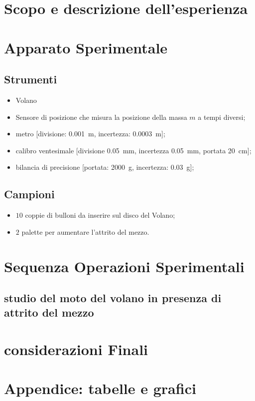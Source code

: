\documentclass[10pt,oneside,a4paper]{article}
\begin{document}
\section{Scopo e descrizione dell'esperienza}
\label{sec:descrizione}



\section{Apparato Sperimentale}
\subsection{Strumenti}
\label{subsec:strumenti}

\begin{itemize}
	\item Volano 
	\item Sensore di posizione che misura la posizione della massa $m$ a tempi diversi;
	\item metro [divisione: \SI{0.001}{m}, incertezza: \SI{0.0003}{m}];
	\item calibro ventesimale [divisione \SI{0,05}{mm}, incertezza \SI{0,05}{mm}, portata \SI{20}{cm}];
	\item bilancia di precisione [portata: \SI{2000}{g}, incertezza: \SI{0.03}{g}];
\end{itemize}
\subsection{Campioni}
\begin{itemize}
	\item $10$ coppie di bulloni da inserire sul disco del Volano; 
	\item $2$ palette per aumentare l'attrito del mezzo.
\end{itemize}

\section{Sequenza Operazioni Sperimentali} 



\subsection{studio del moto del volano in presenza di attrito del mezzo}

\section{considerazioni Finali}

\pagebreak

\section{Appendice: tabelle e grafici}
\end{document}
